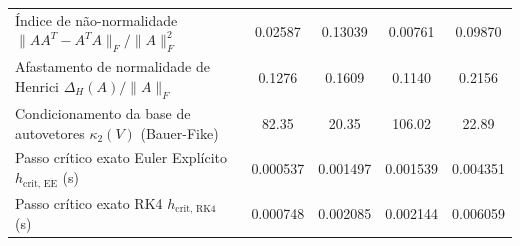 \begin{table}[H]
\begin{tabular}{@{}lcccc@{}}
Índice de não-normalidade $\|A A^T - A^T A\|_F / \|A\|_F^2$ & 0.02587 & 0.13039 & 0.00761 & 0.09870 \\
Afastamento de normalidade de Henrici $\Delta_H(A) / \|A\|_F$ & 0.1276 & 0.1609 & 0.1140 & 0.2156 \\
Condicionamento da base de autovetores $\kappa_2(V)$ (Bauer-Fike) & 82.35 & 20.35 & 106.02 & 22.89 \\
Passo crítico exato Euler Explícito $h_{\text{crit, EE}}$ (s) & 0.000537 & 0.001497 & 0.001539 & 0.004351 \\
Passo crítico exato RK4 $h_{\text{crit, RK4}}$ (s) & 0.000748 & 0.002085 & 0.002144 & 0.006059 \\
\bottomrule
\end{tabular}
\end{table}
